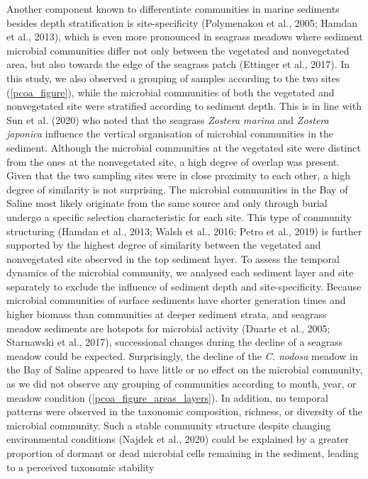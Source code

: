 \documentclass[12pt,]{article}
\begin{document}
Another component known to differentiate communities in marine sediments
besides depth stratification is site-specificity (Polymenakou et al.,
2005; Hamdan et al., 2013), which is even more pronounced in seagrass
meadows where sediment microbial communities differ not only between the
vegetated and nonvegetated area, but also towards the edge of the
seagrass patch (Ettinger et al., 2017). In this study, we also observed
a grouping of samples according to the two sites
(\autoref{pcoa_figure}), while the microbial communities of both the
vegetated and nonvegetated site were stratified according to sediment
depth. This is in line with Sun et al. (2020) who noted that the
seagrass \emph{Zostera marina} and \emph{Zostera japonica} influence the
vertical organisation of microbial communities in the sediment. Although
the microbial communities at the vegetated site were distinct from the
ones at the nonvegetated site, a high degree of overlap was present.
Given that the two sampling sites were in close proximity to each other,
a high degree of similarity is not surprising. The microbial communities
in the Bay of Saline most likely originate from the same source and only
through burial undergo a specific selection characteristic for each
site. This type of community structuring (Hamdan et al., 2013; Walsh et
al., 2016; Petro et al., 2019) is further supported by the highest
degree of similarity between the vegetated and nonvegetated site
observed in the top sediment layer. To assess the temporal dynamics of
the microbial community, we analysed each sediment layer and site
separately to exclude the influence of sediment depth and
site-specificity. Because microbial communities of surface sediments
have shorter generation times and higher biomass than communities at
deeper sediment strata, and seagrass meadow sediments are hotspots for
microbial activity (Duarte et al., 2005; Starnawski et al., 2017),
successional changes during the decline of a seagrass meadow could be
expected. Surprisingly, the decline of the \emph{C. nodosa} meadow in
the Bay of Saline appeared to have little or no effect on the microbial
community, as we did not observe any grouping of communities according
to month, year, or meadow condition
(\autoref{pcoa_figure_areas_layers}). In addition, no temporal patterns
were observed in the taxonomic composition, richness, or diversity of
the microbial community. Such a stable community structure despite
changing environmental conditions (Najdek et al., 2020) could be
explained by a greater proportion of dormant or dead microbial cells
remaining in the sediment, leading to a perceived taxonomic stability
\end{document}
